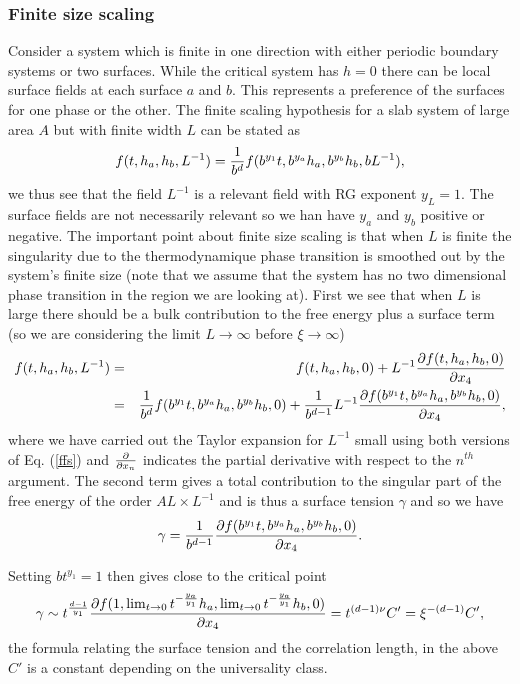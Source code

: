 \subsubsection{Finite size scaling}
Consider a system which is finite in one direction with either periodic boundary systems or 
two surfaces. While the critical system has $h=0$ there can be local surface fields at each surface $a$ and $b$. This represents a preference of the surfaces for one phase or the other. 
The finite scaling hypothesis for a slab  system of large area $A$ but with finite width $L$ can be stated as
\begin{equation}
f(t,h_a,h_b,L^{-1}) = {1\over b^{d}}f(b^{y_1}t, b^{y_a} h_a, b^{y_b} h_b, bL^{-1}), \label{ffs}
\end{equation}
we thus see that the field $L^{-1}$ is a relevant field with RG exponent $y_L=1$. 
The surface fields are not necessarily relevant so we han have $y_a$ and $y_b$ positive or negative. The important point about finite size scaling is that when $L$ is finite the singularity due to the thermodynamique phase transition is smoothed out by the system's finite size (note that we assume that the system has no two dimensional phase transition in the region we are looking at). First we see that when $L$ is large there should be a bulk contribution to the free energy plus a surface term (so we are considering the limit $L\to\infty$ before $\xi\to\infty$)
\begin{eqnarray}
f(t,h_a,h_b,L^{-1})&=& f(t,h_a,h_b,0) + L^{-1}{\partial f(t,h_a,h_b,0)\over \partial x_4} \nonumber\\&=& {1\over  b^d} f(b^{y_1}t, b^{y_a} h_a, b^{y_b} h_b,0)+{1\over  b^{d-1}}L^{-1}{\partial f(b^{y_1}t, b^{y_a} h_a, b^{y_b} h_b, 0)\over \partial x_4},
\end{eqnarray}
where we have carried out the Taylor expansion for $L^{-1}$ small using both versions of Eq. (\ref{ffs}) and ${\partial \over \partial x_n}$ indicates the partial derivative with respect to the $n^{th}$ argument. 
The second term gives a total contribution to the singular part of the free energy of the order $AL \times L^{-1}$ and is thus a surface tension $\gamma$  and so we have
\begin{equation}
\gamma= {1\over  b^{d-1}}{\partial f(b^{y_1}t, b^{y_a} h_a, b^{y_b} h_b, 0)\over \partial x_4}.
\end{equation}


Setting $bt^{y_1}=1$ then gives close to the critical point
\begin{equation}
\gamma \sim t^{d-1\over y_1}{\partial f(1,\lim_{t\to 0}  t^{-\frac{y_a}{y_1}}h_a, \lim_{t\to 0}  t^{-\frac{y_a}{y_1}}h_b,0)\over \partial x_4} = t^{(d-1)\nu}C' = \xi^{-(d-1)}C',
\end{equation}
the formula relating the surface tension and the correlation length, in the above $C'$ is a constant depending on the universality class. 

